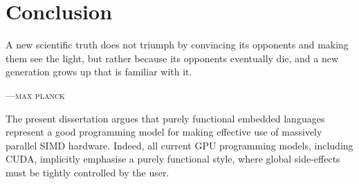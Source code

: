 %
%
%
%
%
%
%
%


\chapter{Conclusion}
\label{ch:conclusion}

\epigraph{A new scientific truth does not triumph by convincing its opponents
and making them see the light, but rather because its opponents eventually die,
and a new generation grows up that is familiar with it.}%
{\textsc{---max planck}}




The present dissertation argues that purely functional embedded languages
represent a good programming model for making effective use of  massively
parallel SIMD hardware. Indeed, all current GPU programming models, including
CUDA, implicitly emphasise a purely functional style, where global side-effects
must be tightly controlled by the user.

